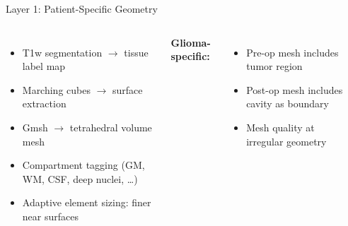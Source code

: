 \begin{frame}{Layer 1: Patient-Specific Geometry}

  \begin{columns}[T]
    \begin{itemize}
      \item T1w segmentation $\to$ tissue label map
      \item Marching cubes $\to$ surface extraction
      \item Gmsh \cite{Geuzaine2009} $\to$ tetrahedral volume mesh
      \item Compartment tagging (GM, WM, CSF, deep nuclei, \ldots)
      \item Adaptive element sizing: finer near surfaces
    \end{itemize}

    \bigskip

    \textbf{Glioma-specific:}
    \begin{itemize}
      \item Pre-op mesh includes tumor region
      \item Post-op mesh includes cavity as boundary
      \item Mesh quality at irregular geometry
    \end{itemize}

    \begin{center}
    \end{center}
  \end{columns}

\end{frame}

